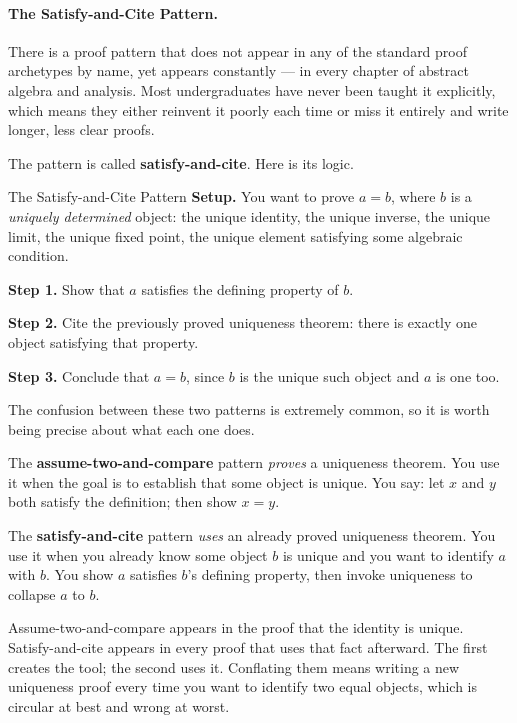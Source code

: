 \paragraph{The Satisfy-and-Cite Pattern.}
\label{sec:satisfy-cite}

There is a proof pattern that does not appear in any of the standard
proof archetypes by name, yet appears constantly --- in every chapter of
abstract algebra and analysis. Most undergraduates have never been taught
it explicitly, which means they either reinvent it poorly each time or
miss it entirely and write longer, less clear proofs.

The pattern is called \textbf{satisfy-and-cite}. Here is its logic.

\begin{propositionbox}{The Satisfy-and-Cite Pattern}
\textbf{Setup.} You want to prove $a = b$, where $b$ is a
\emph{uniquely determined} object: the unique identity, the unique
inverse, the unique limit, the unique fixed point, the unique
element satisfying some algebraic condition.

\medskip
\textbf{Step 1.} Show that $a$ satisfies the defining property of $b$.

\textbf{Step 2.} Cite the previously proved uniqueness theorem: there is
exactly one object satisfying that property.

\textbf{Step 3.} Conclude that $a = b$, since $b$ is the unique such object
and $a$ is one too.
\end{propositionbox}

\begin{remark}
The confusion between these two patterns is extremely common, so it is
worth being precise about what each one does.

The \textbf{assume-two-and-compare} pattern \emph{proves} a uniqueness
theorem. You use it when the goal is to establish that some object is
unique. You say: let $x$ and $y$ both satisfy the definition; then show
$x = y$.

The \textbf{satisfy-and-cite} pattern \emph{uses} an already proved
uniqueness theorem. You use it when you already know some object $b$
is unique and you want to identify $a$ with $b$. You show $a$ satisfies
$b$'s defining property, then invoke uniqueness to collapse $a$ to $b$.

Assume-two-and-compare appears in the proof that the identity is unique.
Satisfy-and-cite appears in every proof that uses that fact afterward.
The first creates the tool; the second uses it. Conflating them means
writing a new uniqueness proof every time you want to identify two equal
objects, which is circular at best and wrong at worst.
\end{remark}

